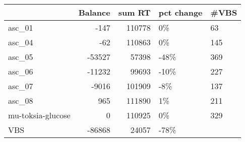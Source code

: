 \begin{tabular}{lrrll}
\toprule
{} &  Balance &  sum RT & pct change & \#VBS \\
\midrule
asc\_01            &     -147 &  110778 &         0\% &   63 \\
asc\_04            &      -62 &  110863 &         0\% &  145 \\
asc\_05            &   -53527 &   57398 &       -48\% &  369 \\
asc\_06            &   -11232 &   99693 &       -10\% &  227 \\
asc\_07            &    -9016 &  101909 &        -8\% &  137 \\
asc\_08            &      965 &  111890 &         1\% &  211 \\
mu-toksia-glucose &        0 &  110925 &         0\% &  329 \\
VBS               &   -86868 &   24057 &       -78\% &      \\
\bottomrule
\end{tabular}
